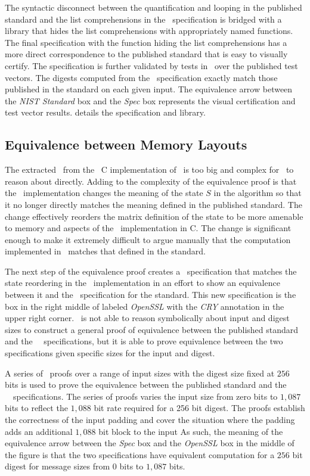 The syntactic disconnect between the quantification and looping in the published standard and the list comprehensions in the \cryptol\ specification is bridged with a library that hides the list comprehensions with appropriately named functions.
The final specification with the function hiding the list comprehensions has a more direct correspondence to the published standard that is easy to visually certify.
The specification is further validated by tests in \cryptol\ over the published test vectors.
The digests computed from the \cryptol\ specification exactly match those published in the standard on each given input.
The equivalence arrow between the \emph{NIST Standard} box and the \emph{Spec} box represents the visual certification and test vector results.
 details the specification and library.

\subsection{Equivalence between Memory Layouts}

The extracted \sawcore\ from the \openssl\ C implementation of \shaThree\ is too big and complex for \saw\ to reason about directly.
Adding to the complexity of the equivalence proof is that the \openssl\ implementation changes the meaning of the state $S$ in the algorithm so that it no longer directly matches the meaning defined in the published standard.
The change effectively reorders the matrix definition of the state to be more amenable to memory and aspects of the \keccak\ implementation in C.
The change is significant enough to make it extremely difficult to argue manually that the computation implemented in \openssl\ matches that defined in the standard.

The next step of the equivalence proof creates a \cryptol\ specification that matches the state reordering in the \openssl\ implementation in an effort to show an equivalence between it and the \cryptol\ specification for the standard.
This new specification is the box in the right middle of  labeled \emph{OpenSSL} with the \emph{CRY} annotation in the upper right corner.
\saw\ is not able to reason symbolically about input and digest sizes to construct a general proof of equivalence between the published standard and the \openssl\ \cryptol\ specifications, but it is able to prove equivalence between the two specifications given specific sizes for the input and digest.

A series of \saw\ proofs over a range of input sizes with the digest size fixed at $256$ bits is used to prove the equivalence between the published standard and the \openssl\ \cryptol\ specifications.
The series of proofs varies the input size from zero bits to $1,087$ bits to reflect the $1,088$ bit rate required for a 256 bit digest.
The proofs establish the correctness of the input padding and cover the situation where the padding adds an additional $1,088$ bit block to the input 
As such, the meaning of the equivalence arrow between the \emph{Spec} box and the \emph{OpenSSL} box in the middle of the figure is that the two specifications have equivalent computation for a $256$ bit digest for message sizes from $0$ bits to $1,087$ bits.

